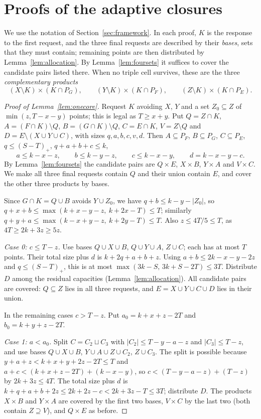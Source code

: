 \documentclass[11pt]{article}
\numberwithin{equation}{section}
\theoremstyle{definition}
\theoremstyle{remark}
\begin{document}
\section{Proofs of the adaptive closures}\label{app:adaptive}

We use the notation of Section~\ref{sec:framework}. In each proof, $K$
is the response to the first request, and the three final requests are
described by their \emph{bases}, sets that they must contain; remaining
points are then distributed by Lemma~\ref{lem:allocation}. By
Lemma~\ref{lem:foursets} it suffices to cover the candidate pairs listed
there. When no triple cell survives, these are the three
\emph{complementary products}
\[
 (X\setminus K)\times(K\cap P_G),\qquad
 (Y\setminus K)\times(K\cap P_F),\qquad
 (Z\setminus K)\times(K\cap P_E).
\]

\begin{proof}[Proof of Lemma~\ref{lem:onecore}]
Request $K$ avoiding $X$, $Y$ and a set $Z_0\subseteq Z$ of
$\min(z,T-x-y)$ points; this is legal as $T\ge x+y$. Put
$Q=Z\cap K$, $A=(F\cap K)\setminus Q$, $B=(G\cap K)\setminus Q$,
$C=E\cap K$, $V=Z\setminus Q$ and $D=E\setminus(X\cup Y\cup C)$, with
sizes $q,a,b,c,v,d$. Then $A\subseteq P_F$, $B\subseteq P_G$,
$C\subseteq P_E$, $q\le(S-T)_+$, $q+a+b+c\le k$,
\[
 a\le k-x-z,\qquad b\le k-y-z,\qquad c\le k-x-y,\qquad d=k-x-y-c .
\]
By Lemma~\ref{lem:foursets} the candidate pairs are $Q\times E$,
$X\times B$, $Y\times A$ and $V\times C$. We make all three final
requests contain $Q$ and their union contain $E$, and cover the other
three products by bases.

Since $G\cap K=Q\cup B$ avoids $Y\cup Z_0$, we have $q+b\le k-y-|Z_0|$, so
$q+x+b\le\max(k+x-y-z,\ k+2x-T)\le T$; similarly
$q+y+a\le\max(k-x+y-z,\ k+2y-T)\le T$. Also $z\le4T/5\le T$, as
$4T\ge2k+3z\ge5z$.

\emph{Case 0: $c\le T-z$.} Use bases $Q\cup X\cup B$, $Q\cup Y\cup A$,
$Z\cup C$; each has at most $T$ points. Their total size plus $d$ is
$k+2q+a+b+z$. Using $a+b\le2k-x-y-2z$ and $q\le(S-T)_+$, this is at most
$\max(3k-S,\,3k+S-2T)\le3T$. Distribute $D$ among the residual
capacities (Lemma~\ref{lem:allocation}). All candidate pairs are
covered: $Q\subseteq Z$ lies in all three requests, and
$E=X\cup Y\cup C\cup D$ lies in their union.

In the remaining cases $c>T-z$. Put $a_0=k+x+z-2T$ and $b_0=k+y+z-2T$.

\emph{Case 1: $a<a_0$.} Split $C=C_2\sqcup C_3$ with $|C_2|\le T-y-a-z$ and
$|C_3|\le T-z$, and use bases
$Q\cup X\cup B$, $Y\cup A\cup Z\cup C_2$, $Z\cup C_3$. The split is
possible because $y+a+z<k+x+y+2z-2T\le T$ and
$a+c<(k+x+z-2T)+(k-x-y)$, so $c<(T-y-a-z)+(T-z)$ by $2k+3z\le4T$. The
total size plus $d$ is $k+q+a+b+2z\le2k+2z-c<2k+3z-T\le3T$; distribute
$D$. The products $X\times B$ and $Y\times A$ are covered by the first
two bases, $V\times C$ by the last two (both contain $Z\supseteq V$),
and $Q\times E$ as before.


\end{proof}
\end{document}
